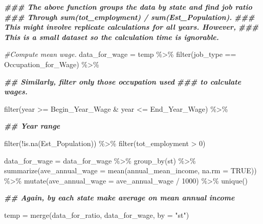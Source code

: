 \documentclass[
]{article}
\newenvironment{Shaded}{\begin{snugshade}}{\end{snugshade}}
\newcommand{\AttributeTok}[1]{\textcolor[rgb]{0.77,0.63,0.00}{#1}}
\newcommand{\CommentTok}[1]{\textcolor[rgb]{0.56,0.35,0.01}{\textit{#1}}}
\newcommand{\ConstantTok}[1]{\textcolor[rgb]{0.00,0.00,0.00}{#1}}
\newcommand{\DecValTok}[1]{\textcolor[rgb]{0.00,0.00,0.81}{#1}}
\newcommand{\DocumentationTok}[1]{\textcolor[rgb]{0.56,0.35,0.01}{\textbf{\textit{#1}}}}
\newcommand{\FunctionTok}[1]{\textcolor[rgb]{0.00,0.00,0.00}{#1}}
\newcommand{\NormalTok}[1]{#1}
\newcommand{\OtherTok}[1]{\textcolor[rgb]{0.56,0.35,0.01}{#1}}
\newcommand{\SpecialCharTok}[1]{\textcolor[rgb]{0.00,0.00,0.00}{#1}}
\newcommand{\StringTok}[1]{\textcolor[rgb]{0.31,0.60,0.02}{#1}}
\begin{document}
\begin{Shaded}
\begin{Highlighting}[]
  \DocumentationTok{\#\#\# The above function groups the data by state and find job ratio}
  \DocumentationTok{\#\#\# Through sum(tot\_employment) / sum(Est\_Population).}
  \DocumentationTok{\#\#\# This might involve replicate calculations for all years. However, }
  \DocumentationTok{\#\#\# This is a small dataset so the calculation time is ignorable.}
  
  \CommentTok{\#Compute mean wage.}
\NormalTok{  data\_for\_wage }\OtherTok{=}\NormalTok{ temp }\SpecialCharTok{\%\textgreater{}\%} \FunctionTok{filter}\NormalTok{(job\_type }\SpecialCharTok{==}\NormalTok{ Occupation\_for\_Wage) }\SpecialCharTok{\%\textgreater{}\%}
    
    \DocumentationTok{\#\# Similarly, filter only those occupation used}
    \DocumentationTok{\#\#\# to calculate wages.}
    
    \FunctionTok{filter}\NormalTok{(year }\SpecialCharTok{\textgreater{}=}\NormalTok{ Begin\_Year\_Wage }\SpecialCharTok{\&}\NormalTok{ year }\SpecialCharTok{\textless{}=}\NormalTok{ End\_Year\_Wage) }\SpecialCharTok{\%\textgreater{}\%}
    
    \DocumentationTok{\#\# Year range}
    
    \FunctionTok{filter}\NormalTok{(}\SpecialCharTok{!}\FunctionTok{is.na}\NormalTok{(Est\_Population)) }\SpecialCharTok{\%\textgreater{}\%} \FunctionTok{filter}\NormalTok{(tot\_employment }\SpecialCharTok{\textgreater{}} \DecValTok{0}\NormalTok{)}
  
\NormalTok{  data\_for\_wage }\OtherTok{=}\NormalTok{ data\_for\_wage }\SpecialCharTok{\%\textgreater{}\%} \FunctionTok{group\_by}\NormalTok{(st) }\SpecialCharTok{\%\textgreater{}\%}
    \FunctionTok{summarize}\NormalTok{(}\AttributeTok{ave\_annual\_wage =} \FunctionTok{mean}\NormalTok{(annual\_mean\_income, }\AttributeTok{na.rm =} \ConstantTok{TRUE}\NormalTok{)) }\SpecialCharTok{\%\textgreater{}\%}
    \FunctionTok{mutate}\NormalTok{(}\AttributeTok{ave\_annual\_wage =}\NormalTok{ ave\_annual\_wage }\SpecialCharTok{/} \DecValTok{1000}\NormalTok{) }\SpecialCharTok{\%\textgreater{}\%}
    \FunctionTok{unique}\NormalTok{()}
  
  \DocumentationTok{\#\# Again, by each state make average on mean annual income}
  
\NormalTok{  temp }\OtherTok{=} \FunctionTok{merge}\NormalTok{(data\_for\_ratio, data\_for\_wage, }\AttributeTok{by =} \StringTok{"st"}\NormalTok{)}
  

\end{Highlighting}
\end{Shaded}
\end{document}
